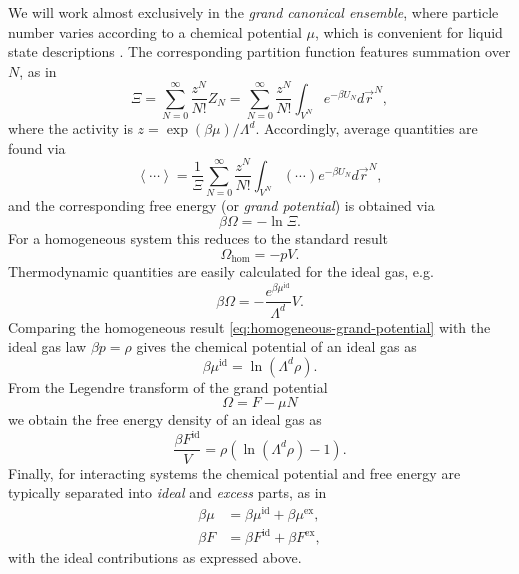 We will work almost exclusively in the \emph{grand canonical ensemble}, where particle number varies according to a chemical potential $\mu$, which is convenient for liquid state descriptions%
.
The corresponding partition function features summation over $N$, as in
\begin{equation}\label{eq:grand-canonical-partition}
  \Xi
  =
  \sum_{N=0}^\infty \frac{z^N}{N!} Z_N
  =
  \sum_{N=0}^\infty \frac{z^N}{N!}
  \int_{V^N} e^{-\beta U_N} d\vec{r}^N,
\end{equation}
where the activity is $z = \exp{(\beta\mu)} / \Lambda^d$.
Accordingly, average quantities are found via
\begin{equation}\label{eq:grand-canonical-average}
  \left< \cdots \right>
  =
  \frac{1}{\Xi} \sum_{N=0}^\infty \frac{z^N}{N!}
  \int_{V^N} \left(\cdots\right) e^{-\beta U_N} d\vec{r}^N,
\end{equation}
and the corresponding free energy (or \emph{grand potential}) is obtained via
\begin{equation*}
  \beta \Omega = -\ln{\Xi}.
\end{equation*}
For a homogeneous system this reduces to the standard result
\begin{equation}\label{eq:homogeneous-grand-potential}
  \Omega_\mathrm{hom} = - p V.
\end{equation}
Thermodynamic quantities are easily calculated for the ideal gas, e.g.\
\begin{equation*}
  \beta\Omega = - \frac{e^{\beta\mu^\mathrm{id}}}{\Lambda^d} V.
\end{equation*}
Comparing the homogeneous result \eqref{eq:homogeneous-grand-potential} with the ideal gas law $\beta p = \rho$ gives the chemical potential of an ideal gas as
\begin{equation}\label{eq:ideal-chemical-potential}
  \beta \mu^\mathrm{id} = \ln{(\Lambda^d \rho)}.
\end{equation}
From the Legendre transform of the grand potential
\begin{equation}\label{eq:grand-potential-legendre-transform}
  \Omega = F - \mu N
\end{equation}
we obtain the free energy density of an ideal gas as
\begin{equation}\label{eq:ideal-free-energy-density}
  \frac{\beta F^\mathrm{id}}{V} = \rho (\ln{(\Lambda^d \rho)} - 1).
\end{equation}
Finally, for interacting systems the chemical potential and free energy are typically separated into \emph{ideal} and \emph{excess} parts, as in
\begin{align*}
  \beta \mu &= \beta \mu^\mathrm{id} + \beta \mu^\mathrm{ex},
  \\
  \beta F &= \beta F^\mathrm{id} + \beta F^\mathrm{ex},
\end{align*}
with the ideal contributions as expressed above.

